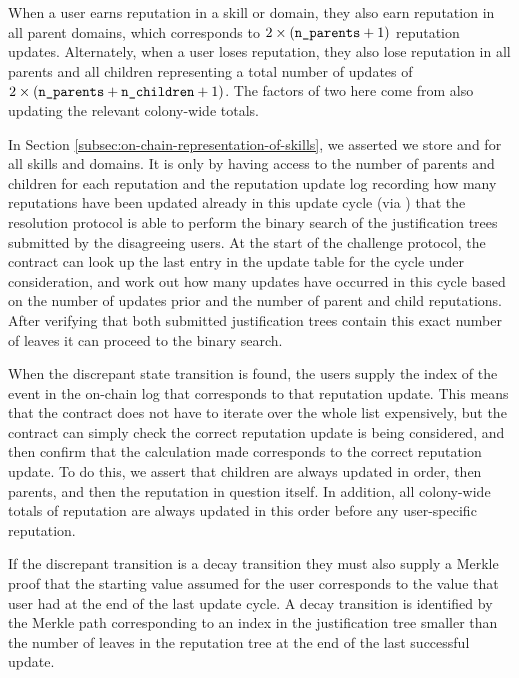 When a user earns reputation in a skill or domain, they also earn reputation in all parent domains, which corresponds to $2\times\left(\texttt{n\_parents}+1\right)$ reputation updates. Alternately, when a user loses reputation, they also lose reputation in all parents and all children representing a total number of updates of $2\times\left(\texttt{n\_parents} + \texttt{n\_children} + 1\right)$. The factors of two here come from also updating the relevant colony-wide totals.

In Section \ref{subsec:on-chain-representation-of-skills}, we asserted we store  and  for all skills and domains. It is only by having access to the number of parents and children for each reputation and the reputation update log recording how many reputations have been updated already in this update cycle (via ) that the resolution protocol is able to perform the binary search of the justification trees submitted by the disagreeing users. At the start of the challenge protocol, the contract can look up the last entry in the update table for the cycle under consideration, and work out how many updates have occurred in this cycle based on the number of updates prior and the number of parent and child reputations. After verifying that both submitted justification trees contain this exact number of leaves it can proceed to the binary search.

When the discrepant state transition is found, the users supply the index of the event in the on-chain log that corresponds to that reputation update.  This means that the contract does not have to iterate over the whole list expensively, but the contract can simply check the correct reputation update is being considered, and then confirm that the calculation made corresponds to the correct reputation update. To do this, we assert that children are always updated in order, then parents, and then the reputation in question itself. In addition, all colony-wide totals of reputation are always updated in this order before any user-specific reputation.

If the discrepant transition is a decay transition they must also supply a Merkle proof that the starting value assumed for the user corresponds to the value that user had at the end of the last update cycle. A decay transition is identified by the Merkle path corresponding to an index in the justification tree smaller than the number of leaves in the reputation tree at the end of the last successful update.

